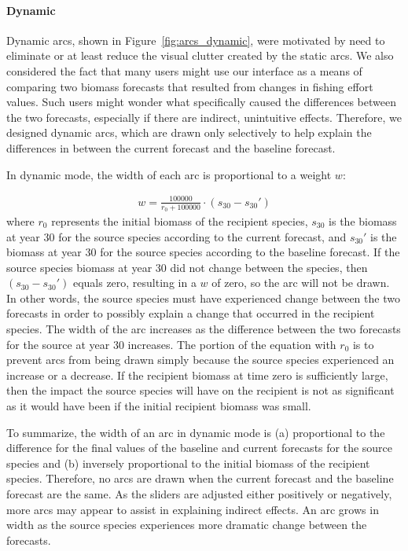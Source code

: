 \paragraph{Dynamic}

Dynamic arcs, shown in Figure~\ref{fig:arcs_dynamic}, were motivated by need to eliminate or at least reduce the visual clutter created by the static arcs.  We also considered the fact that many users might use our interface as a means of comparing two biomass forecasts that resulted from changes in fishing effort values.  Such users might wonder what specifically caused the differences between the two forecasts, especially if there are indirect, unintuitive effects.  Therefore, we designed dynamic arcs, which are drawn only selectively to help explain the differences in between the current forecast and the baseline forecast.

In dynamic mode, the width of each arc is proportional to a weight $w$:

\begin{align}
w = \frac{100000}{r_{0} + 100000} \cdot (s_{30} - s_{30}')
\end{align}
where $r_{0}$ represents the initial biomass of the recipient species, $s_{30}$ is the biomass at year 30 for the source species according to the current forecast, and $s_{30}'$ is the biomass at year 30 for the source species according to the baseline forecast.  If the source species biomass at year 30 did not change between the species, then $(s_{30} - s_{30}')$ equals zero, resulting in a $w$ of zero, so the arc will not be drawn.  In other words, the source species must have experienced change between the two forecasts in order to possibly explain a change that occurred in the recipient species.  The width of the arc increases as the difference between the two forecasts for the source at year 30 increases.  The portion of the equation with $r_{0}$ is to prevent arcs from being drawn simply because the source species experienced an increase or a decrease.  If the recipient biomass at time zero is sufficiently large, then the impact the source species will have on the recipient is not as significant as it would have been if the initial recipient biomass was small.

To summarize, the width of an arc in dynamic mode is (a) proportional to the difference for the final values of the baseline and current forecasts for the source species and (b) inversely proportional to the initial biomass of the recipient species.  Therefore, no arcs are drawn when the current forecast and the baseline forecast are the same.  As the sliders are adjusted either positively or negatively, more arcs may appear to assist in explaining indirect effects.  An arc grows in width as the source species experiences more dramatic change between the forecasts.

